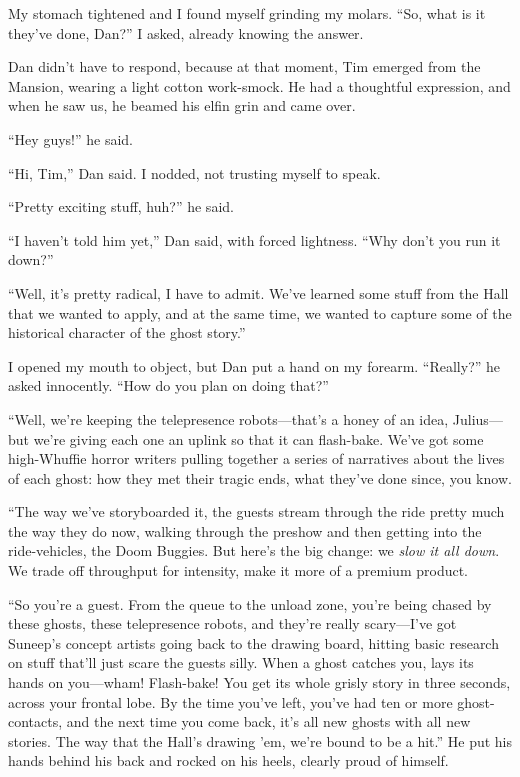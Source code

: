 My stomach tightened and I found myself grinding my molars. “So,
what is it they've done, Dan?” I asked, already knowing the
answer.

Dan didn't have to respond, because at that moment, Tim emerged
from the Mansion, wearing a light cotton work-smock. He had a
thoughtful expression, and when he saw us, he beamed his elfin grin
and came over.

“Hey guys!” he said.

“Hi, Tim,” Dan said. I nodded, not trusting myself to speak.

“Pretty exciting stuff, huh?” he said.

“I haven't told him yet,” Dan said, with forced lightness. “Why
don't you run it down?”

“Well, it's pretty radical, I have to admit. We've learned some
stuff from the Hall that we wanted to apply, and at the same time,
we wanted to capture some of the historical character of the ghost
story.”

I opened my mouth to object, but Dan put a hand on my forearm.
“Really?” he asked innocently. “How do you plan on doing that?”

“Well, we're keeping the telepresence robots—that's a honey of an
idea, Julius—but we're giving each one an uplink so that it can
flash-bake. We've got some high-Whuffie horror writers pulling
together a series of narratives about the lives of each ghost: how
they met their tragic ends, what they've done since, you know.

“The way we've storyboarded it, the guests stream through the ride
pretty much the way they do now, walking through the preshow and
then getting into the ride-vehicles, the Doom Buggies. But here's
the big change: we \emph{slow it all down}. We trade off throughput
for intensity, make it more of a premium product.

“So you're a guest. From the queue to the unload zone, you're being
chased by these ghosts, these telepresence robots, and they're
really scary—I've got Suneep's concept artists going back to the
drawing board, hitting basic research on stuff that'll just scare
the guests silly. When a ghost catches you, lays its hands on
you—wham! Flash-bake! You get its whole grisly story in three
seconds, across your frontal lobe. By the time you've left, you've
had ten or more ghost-contacts, and the next time you come back,
it's all new ghosts with all new stories. The way that the Hall's
drawing 'em, we're bound to be a hit.” He put his hands behind his
back and rocked on his heels, clearly proud of himself.

